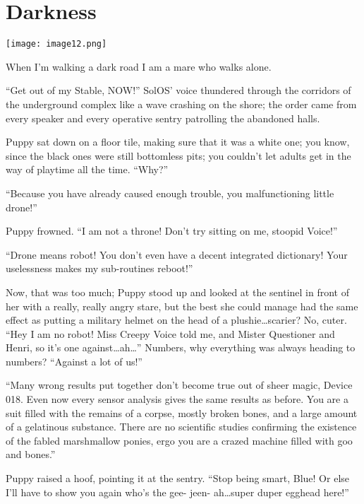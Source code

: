 \chapter{Darkness}

\texttt{[image: image12.png]}

\begin{intro}
    When I'm walking a dark road I am a mare who walks alone.
\end{intro}


``Get out of my Stable, NOW!'' SolOS' voice thundered through the corridors of the underground complex like a wave crashing on the shore; the order came from every speaker and every operative sentry patrolling the abandoned halls.

Puppy sat down on a floor tile, making sure that it was a white one; you know, since the black ones were still bottomless pits; you couldn't let adults get in the way of playtime all the time. ``Why?''

``Because you have already caused enough trouble, you malfunctioning little drone!''

Puppy frowned. ``I am not a throne! Don't try sitting on me, stoopid Voice!''

``Drone means robot! You don't even have a decent integrated dictionary! Your uselessness makes my sub-routines reboot!''

Now, that was too much; Puppy stood up and looked at the sentinel in front of her with a really, really angry stare, but the best she could manage had the same effect as putting a military helmet on the head of a plushie\dots scarier? No, cuter. ``Hey I am no robot! Miss Creepy Voice told me, and Mister Questioner and Henri, so it's one against\dots ah\dots'' Numbers, why everything was always heading to numbers? ``Against a lot of us!''

``Many wrong results put together don't become true out of sheer magic, Device 018. Even now every sensor analysis gives the same results as before. You are a suit filled with the remains of a corpse, mostly broken bones, and a large amount of a gelatinous substance. There are no scientific studies confirming the existence of the fabled marshmallow ponies, ergo you are a crazed machine filled with goo and bones.''

Puppy raised a hoof, pointing it at the sentry. ``Stop being smart, Blue! Or else I'll have to show you again who's the gee- jeen- ah\dots super duper egghead here!''

